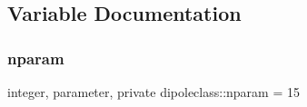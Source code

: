 \subsection{Variable Documentation}
\mbox{\label{namespacedipoleclass_abc619199e1e9a2811da9e97630125da3}} 
\subsubsection{\texorpdfstring{nparam}{nparam}}
{\footnotesize\ttfamily integer, parameter, private dipoleclass\+::nparam = 15\hspace{0.3cm}{\ttfamily [private]}}

